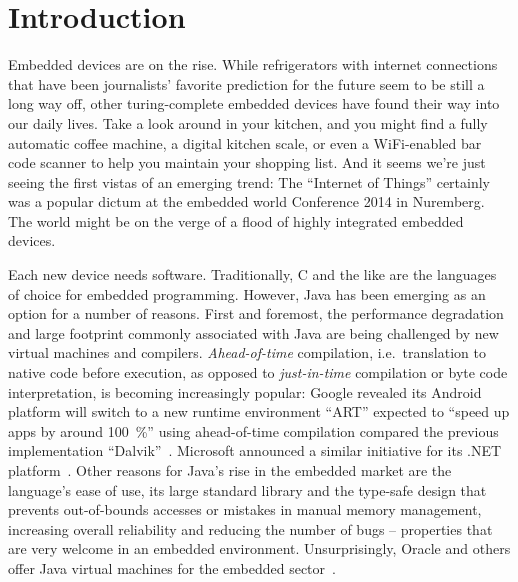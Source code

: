 
\chapter{Introduction}
	\label{chapter:intro}
	Embedded devices are on the rise. While refrigerators with internet connections that have been journalists' favorite
	prediction for the future seem to be still a long way off, other turing-complete embedded devices have found their way
	into our daily lives. Take a look around in your kitchen, and you might find a fully automatic coffee machine,
	a digital kitchen scale, or even a WiFi-enabled bar code scanner to help you maintain your shopping list. And it seems
	we're just seeing the first vistas of an emerging trend: The \enquote{Internet of Things} certainly was a popular
	dictum at the embedded world Conference 2014 in Nuremberg. The world might be on the verge of a flood of highly
	integrated embedded devices.


	Each new device needs software. Traditionally, C and the like are the languages of choice for embedded programming.
	However, Java has been emerging as an option for a number of reasons. First and foremost, the performance degradation
	and large footprint commonly associated with Java are being challenged by new virtual machines and compilers.
	\emph{Ahead-of-time} compilation, i.e.\ translation to native code before execution, as opposed to \emph{just-in-time}
	compilation or byte code interpretation, is becoming increasingly popular: Google revealed its Android platform will
	switch to a new runtime environment \enquote{ART} expected to \enquote{speed up apps by around 100~\%} using
	ahead-of-time compilation compared the previous implementation \enquote{Dalvik}~\cite{lindner:14:android-art,
	anthony:13:android-art}. Microsoft announced a similar initiative for its .NET
	platform~\cite{lardinois:14:dotnet-aot}. Other reasons for Java's rise in the embedded market are the language's ease
	of use, its large standard library and the type-safe design that prevents out-of-bounds accesses or mistakes in manual
	memory management, increasing overall reliability and reducing the number of bugs – properties that are very welcome
	in an embedded environment. Unsurprisingly, Oracle and others offer Java virtual machines for the embedded
	sector~\cite{merritt:13:java-for-IoT, maxfield:12:IS2T-JVM}.

